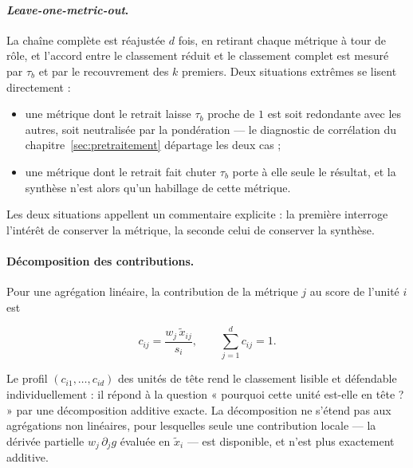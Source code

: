 \documentclass[11pt,a4paper]{article}
\theoremstyle{definition}
\theoremstyle{remark}
\begin{document}
\bigskip

\paragraph{\emph{Leave-one-metric-out}.} La chaîne complète est réajustée $d$ fois, en
retirant chaque métrique à tour de rôle, et l'accord entre le classement réduit et le
classement complet est mesuré par $\tau_b$ et par le recouvrement des $k$ premiers. Deux
situations extrêmes se lisent directement :

\medskip

\begin{itemize}[nosep,leftmargin=1.4em]
  \item une métrique dont le retrait laisse $\tau_b$ proche de $1$ est soit redondante avec
  les autres, soit neutralisée par la pondération --- le diagnostic de corrélation du
  chapitre~\ref{sec:pretraitement} départage les deux cas ;
  \item une métrique dont le retrait fait chuter $\tau_b$ porte à elle seule le résultat, et
  la synthèse n'est alors qu'un habillage de cette métrique.
\end{itemize}

\bigskip

Les deux situations appellent un commentaire explicite : la première interroge l'intérêt de
conserver la métrique, la seconde celui de conserver la synthèse.

\bigskip

\paragraph{Décomposition des contributions.} Pour une agrégation linéaire, la contribution
de la métrique $j$ au score de l'unité $i$ est

\medskip

\[
  c_{ij} = \frac{w_j\,\tilde{x}_{ij}}{s_i},
  \qquad \sum_{j=1}^{d} c_{ij} = 1 .
\]

\bigskip

Le profil $(c_{i1},\dots,c_{id})$ des unités de tête rend le classement lisible et
défendable individuellement : il répond à la question « pourquoi cette unité est-elle en
tête ? » par une décomposition additive exacte. La décomposition ne s'étend pas aux
agrégations non linéaires, pour lesquelles seule une contribution locale --- la dérivée
partielle $w_j\,\partial_j g$ évaluée en $\tilde{x}_i$ --- est disponible, et n'est plus
exactement additive.
\end{document}
